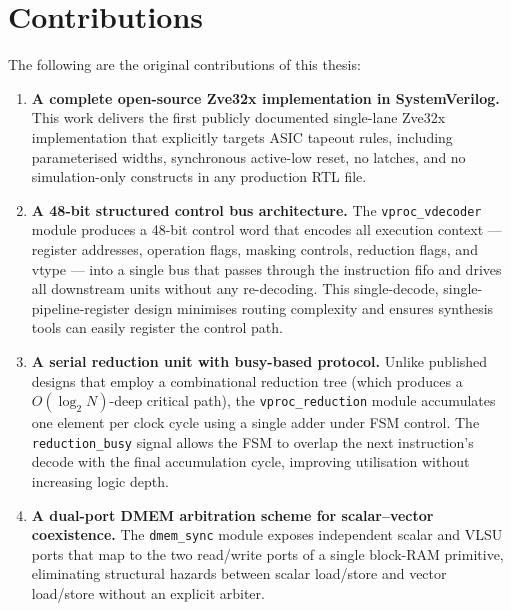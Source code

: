 \section{Contributions}
\label{sec:contributions}

The following are the original contributions of this thesis:

\begin{enumerate}[label=\arabic*.]
  \item \textbf{A complete open-source Zve32x implementation in SystemVerilog.}
        This work delivers the first publicly documented single-lane Zve32x
        implementation that explicitly targets ASIC tapeout rules, including
        parameterised widths, synchronous active-low reset, no latches, and no
        simulation-only constructs in any production RTL file.

  \item \textbf{A 48-bit structured control bus architecture.}
        The \texttt{vproc\_vdecoder} module produces a 48-bit control word that
        encodes all execution context --- register addresses, operation flags,
        masking controls, reduction flags, and vtype --- into a single bus that passes
        through the instruction \gls{fifo} and drives all downstream units without
        any re-decoding. This single-decode, single-pipeline-register design minimises
        routing complexity and ensures synthesis tools can easily register the control
        path.

  \item \textbf{A serial reduction unit with busy-based protocol.}
        Unlike published designs that employ a combinational reduction tree (which
        produces a $O(\log_2 N)$-deep critical path), the \texttt{vproc\_reduction}
        module accumulates one element per clock cycle using a single adder under
        FSM control. The \texttt{reduction\_busy} signal allows the FSM to overlap
        the next instruction's decode with the final accumulation cycle, improving
        utilisation without increasing logic depth.

  \item \textbf{A dual-port DMEM arbitration scheme for scalar--vector coexistence.}
        The \texttt{dmem\_sync} module exposes independent scalar and VLSU ports that
        map to the two read/write ports of a single block-RAM primitive, eliminating
        structural hazards between scalar load/store and vector load/store without
        an explicit arbiter.


\end{enumerate}
